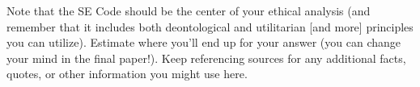 \documentclass[12pt]{article}
\begin{document}
Note that the SE Code should be the center of your ethical analysis (and remember that it includes both deontological and utilitarian [and more] principles you can utilize). Estimate where you'll end up for your answer (you can change your mind in the final paper!). Keep referencing sources for any additional facts, quotes, or other information you might use here. \cite{handout}

\nocite{texTemp}
\nocite{BibTex}
\nocite{BibMang}
\nocite{bibStyle}




\end{document}
